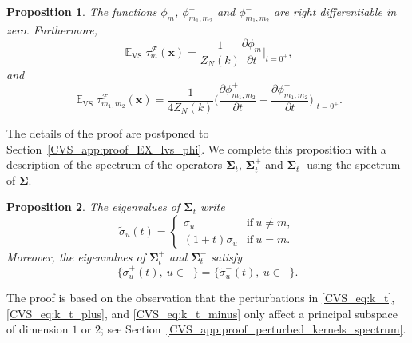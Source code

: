\documentclass[twoside,11pt]{book}
\newtheorem{proposition}{Proposition}
\numberwithin{theorem}{chapter}
\numberwithin{definition}{chapter}
\numberwithin{proposition}{chapter}
\numberwithin{corollary}{chapter}
\numberwithin{example}{chapter}
\numberwithin{lemma}{chapter}
\numberwithin{assumption}{chapter}
\numberwithin{equation}{chapter}
\numberwithin{figure}{chapter}
\DeclareMathOperator{\VS}{\mathrm{VS}}
\DeclareMathOperator{\EX}{\mathbb{E}}
\DeclareMathOperator{\F}{\mathcal{F}}
\DeclareMathOperator{\Ns}{\mathbb{N}^{*}}
\begin{document}
\begin{proposition}\label{CVS_thm:EX_lvs_phi}
The functions $\phi_m$, $\phi_{m_1,m_2}^{+}$ and $\phi_{m_1,m_2}^{-}$ are right differentiable in zero. Furthermore,
\begin{equation}\label{CVS_eq:EX_lvs_n_delta_phi_n}
\EX_{\VS} \tau_{m}^{\F}(\bm{x})  = \frac{1}{Z_{N}(k)}  \frac{\partial \phi_{m}}{ \partial t }\bigg|_{t = 0^{+}}, \nonumber
\end{equation}
and
\begin{equation}\label{CVS_eq:EX_VS_cross_lvs_formula}
\EX_{\VS} \tau_{m_{1},m_{2}}^{\F}(\bm{x}) = \frac{1}{4Z_{N}(k)} \bigg(\frac{\partial \phi_{m_{1},m_{2}}^{+}}{ \partial t } - \frac{\partial \phi_{m_{1},m_{2}}^{-}}{ \partial t }\bigg)\bigg|_{t = 0^{+}}. \nonumber
\end{equation}
\end{proposition}
 The details of the proof are postponed to Section~\ref{CVS_app:proof_EX_lvs_phi}. We complete this proposition with a description of the spectrum of the operators $\bm{\Sigma}_{t}$, $\bm{\Sigma}_{t}^{+}$ and $\bm{\Sigma}_{t}^{-}$ using the spectrum of $\bm{\Sigma}$.
\begin{proposition}\label{CVS_prop:perturbed_kernels_spectrum}
The eigenvalues of $\bm{\Sigma}_{t}$ write
\begin{equation}
\tilde{\sigma}_{u}(t) =  \left\{
    \begin{array}{ll}
        \sigma_{u} & \mbox{if} \: u \neq m, \\
        (1 + t)\sigma_{u} & \mbox{if}\: u = m.
    \end{array}
\right.
\end{equation}
Moreover, the eigenvalues of $\bm{\Sigma}_{t}^{+}$ and $\bm{\Sigma}_{t}^{-}$ satisfy
\begin{equation}\label{CVS_eq:equality_positive_negative_spectrum}
\{\tilde{\sigma}_{u}^{+}(t), \: u \in \Ns \} = \{\tilde{\sigma}_{u}^{-}(t), \: u \in \Ns \}.
\end{equation}
\end{proposition}
The proof is based on the observation that the perturbations in \eqref{CVS_eq:k_t}, \eqref{CVS_eq:k_t_plus}, and \eqref{CVS_eq:k_t_minus} only affect a principal subspace of dimension $1$ or $2$; see Section~\ref{CVS_app:proof_perturbed_kernels_spectrum}.
\end{document}
